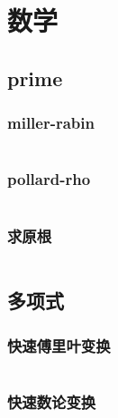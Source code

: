 \section{数学}
\subsection{prime}
\subsubsection{miller-rabin}
\inputminted[breaklines]{cpp}{math/prime/miller-rabin.cpp}
\subsubsection{pollard-rho}
\inputminted[breaklines]{cpp}{math/prime/pollard-rho.cpp}
\subsubsection{求原根}
\inputminted[breaklines]{cpp}{math/prime/get-primitive-root.cpp}
\subsection{多项式}
\subsubsection{快速傅里叶变换}
\inputminted[breaklines]{cpp}{math/polynomial/FFT.cpp}
\subsubsection{快速数论变换}
\inputminted[breaklines]{cpp}{math/polynomial/NTT.cpp}